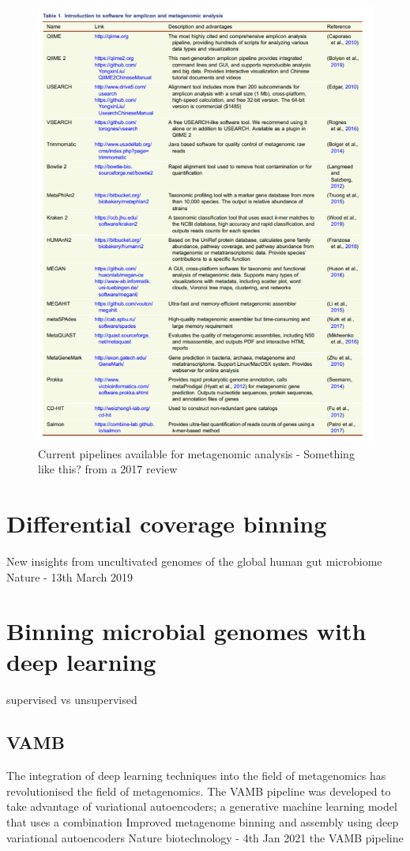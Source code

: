 \documentclass{article}
\begin{document}
\begin{figure}
\centering
\includegraphics[scale=0.7]{figures/table.png}
\caption[Current pipelines available for metagenomic analysis]{
	Current pipelines available for metagenomic analysis - Something like this? from a 2017 review}
\label{Fpipelines}
\end{figure}

\section{Differential coverage binning}
New insights from uncultivated genomes of the global human gut microbiome
Nature - 13th March 2019 \cite{nayfach2019new}

\section{Binning microbial genomes with deep learning}
supervised vs unsupervised
\subsection{VAMB}
The integration of deep learning techniques into the field of metagenomics has revolutionised the field of metagenomics.
The VAMB pipeline was developed to take advantage of variational autoencoders; a generative machine learning model that uses a combination 
Improved metagenome binning and assembly using deep variational autoencoders
Nature biotechnology - 4th Jan 2021
the VAMB pipeline \cite{nissenimproved}
\end{document}
